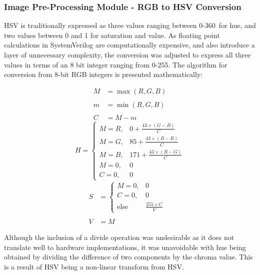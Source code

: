 \documentclass[a4paper]{article}
\begin{document}
\subsubsection{Image Pre-Processing Module - RGB to HSV Conversion} 


HSV is traditionally expressed as three values ranging between 0-360\degree\  
for hue, and two values between 0 and 1 for saturation and value.\cite{10.1145/965139.807361}
As floating point calculations in SystemVerilog are computationally expensive, 
and also introduce a layer of unnecessary complexity, the conversion was adjusted
to express all three values in terms of an 8 bit integer ranging from 0-255. The
algorithm for conversion from 8-bit RGB integers is presented mathematically:

\begin{multicols}{3}
    \noindent
    \begin{align*}
        M &= \max(R, G, B) \\ \\
        m &= \min(R, G, B) \\ \\
        C &= M-m 
    \end{align*}
    \begin{equation*}
        H = \begin{cases}
            M = R, & 0 + \frac{43 \times (G-B)}{C} \\
            M = G, & 85 + \frac{43 \times (B-R)}{C} \\
            M = B, & 171 + \frac{43 \times (R-G)}{C} \\
            M = 0, & 0 \\
            C = 0, & 0
        \end{cases} 
    \end{equation*}
    \begin{align*}
        S &= \begin{cases}
            M = 0, & 0 \\ C = 0, & 0 \\ \text{else} & \frac{255\times C}{V}
        \end{cases} & \\ \\
         V &= M  
    \end{align*}
\end{multicols}



Although the inclusion of a divide operation was undesirable as it does not 
translate well to hardware implementations, it was unavoidable with hue being 
obtained by dividing the difference of two components by the chroma value. This 
is a result of HSV being a non-linear transform from HSV. 
\end{document}
